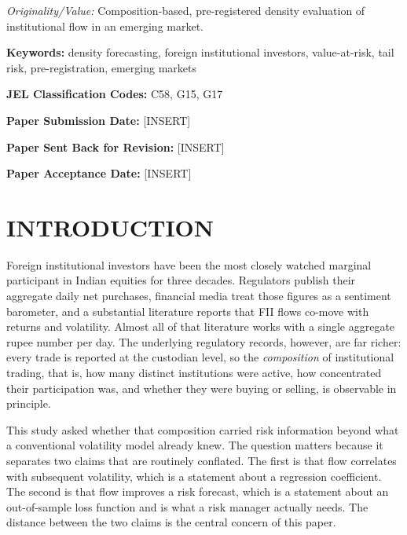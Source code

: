 \documentclass[12pt]{article}
\begin{document}
\emph{Originality/Value:} Composition-based, pre-registered density evaluation
of institutional flow in an emerging market.

\vspace{0.5\baselineskip}

\textbf{Keywords:} density forecasting, foreign institutional investors,
value-at-risk, tail risk, pre-registration, emerging markets

\vspace{0.5\baselineskip}

\textbf{JEL Classification Codes:} C58, G15, G17

\vspace{0.5\baselineskip}

\textbf{Paper Submission Date:} [INSERT]

\textbf{Paper Sent Back for Revision:} [INSERT]

\textbf{Paper Acceptance Date:} [INSERT]

\vspace{\baselineskip}

\section*{INTRODUCTION}

Foreign institutional investors have been the most closely watched marginal
participant in Indian equities for three decades. Regulators publish their
aggregate daily net purchases, financial media treat those figures as a
sentiment barometer, and a substantial literature reports that FII flows
co-move with returns and volatility. Almost all of that literature works with
a single aggregate rupee number per day. The underlying regulatory records,
however, are far richer: every trade is reported at the custodian level, so
the \emph{composition} of institutional trading, that is, how many distinct
institutions were active, how concentrated their participation was, and
whether they were buying or selling, is observable in principle.

This study asked whether that composition carried risk information beyond what
a conventional volatility model already knew. The question matters because it
separates two claims that are routinely conflated. The first is that flow
correlates with subsequent volatility, which is a statement about a regression
coefficient. The second is that flow improves a risk forecast, which is a
statement about an out-of-sample loss function and is what a risk manager
actually needs. The distance between the two claims is the central concern of
this paper.
\end{document}
